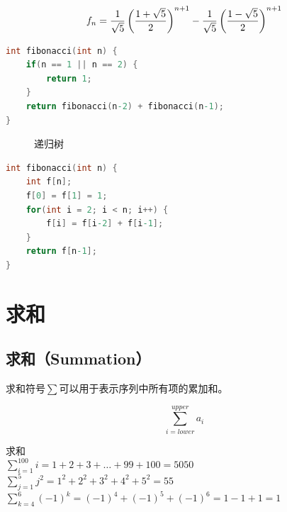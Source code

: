 \documentclass[12pt, openany, oneside]{book}
\begin{document}
$$
	f_n = {1 \over \sqrt{5}} \left({1 + \sqrt{5} \over 2} \right)^{n+1} - {1 \over \sqrt{5}} \left({1 - \sqrt{5} \over 2} \right)^{n+1}
$$

\begin{lstlisting}[language=C, title=斐波那契数列（递归）]
int fibonacci(int n) {
	if(n == 1 || n == 2) {
		return 1;
	}
	return fibonacci(n-2) + fibonacci(n-1);
}
\end{lstlisting}

\begin{figure}[H]
	\centering
	\caption{递归树}
\end{figure}

\begin{lstlisting}[language=C, title=斐波那契数列（迭代）]
int fibonacci(int n) {
	int f[n];
	f[0] = f[1] = 1;
	for(int i = 2; i < n; i++) {
		f[i] = f[i-2] + f[i-1];
	}
	return f[n-1];
}
\end{lstlisting}

\newpage

\section{求和}

\subsection{求和（Summation）}

求和符号$ \sum $可以用于表示序列中所有项的累加和。

$$
	\sum_{i=lower}^{upper} a_i
$$

\begin{tcolorbox}
	求和\\
	$ \sum_{i=1}^{100} i = 1 + 2 +3 + \dots + 99 + 100 = 5050 $\\
	$ \sum_{j=1}^{5} j^2 = 1^2 + 2^2 + 3^2 + 4^2 + 5^2 = 55 $\\
	$ \sum_{k=4}^{6} (-1)^k = (-1)^4 + (-1)^5 + (-1)^6 = 1 - 1 + 1 = 1 $
\end{tcolorbox}
\end{document}
